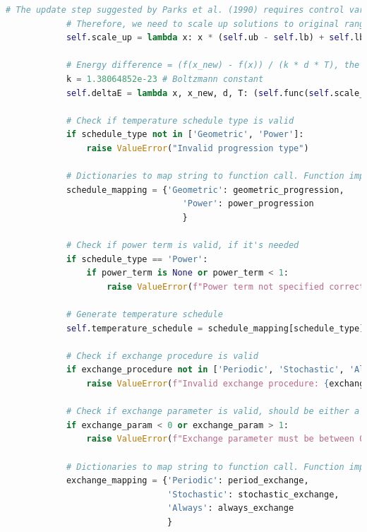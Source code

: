 \documentclass[10pt]{article}
\begin{document}
\begin{lstlisting}[language=Python, caption=PT.py, label=PTpy]
            # The update step suggested by Parks et al. (1990) requires control variables to be scaled to [0, 1]
            # Therefore, we need to scale up solutions to original range when evaluating the objective function
            self.scale_up = lambda x: x * (self.ub - self.lb) + self.lb
    
            # Energy difference = (f(x_new) - f(x)) / (k * d * T), the term in the exponent of the Metropolis criterion
            k = 1.38064852e-23 # Boltzmann constant
            self.deltaE = lambda x, x_new, d, T: (self.func(self.scale_up(x_new)) - self.func(self.scale_up(x))) / (k * d * T)
            
            # Check if temperature schedule type is valid
            if schedule_type not in ['Geometric', 'Power']:
                raise ValueError("Invalid progression type")
            
            # Dictionaries to map string to function call. Function imported from directory files
            schedule_mapping = {'Geometric': geometric_progression, 
                                   'Power': power_progression
                                   }
            
            # Check if power term is valid, if it's needed
            if schedule_type == 'Power':
                if power_term is None or power_term < 1:
                    raise ValueError(f"Power term not specified correctly: {power_term}. Must be greater than 1.")
    
            # Generate temperature schedule
            self.temperature_schedule = schedule_mapping[schedule_type](num_replicas, power_term)
    
            # Check if exchange procedure is valid
            if exchange_procedure not in ['Periodic', 'Stochastic', 'Always']:
                raise ValueError(f"Invalid exchange procedure: {exchange_procedure}.")
             
            # Check if exchange parameter is valid, should be either a probability or a percentage
            if exchange_param < 0 or exchange_param > 1:
                raise ValueError(f"Exchange parameter must be between 0 and 1: {exchange_param}.")
            
            # Dictionaries to map string to function call. Function imported from directory files
            exchange_mapping = {'Periodic': period_exchange,
                                'Stochastic': stochastic_exchange,
                                'Always': always_exchange
                                }
            

\end{lstlisting}
\end{document}
